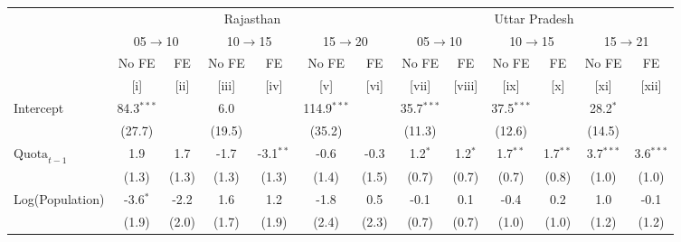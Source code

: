 
\begingroup
\centering
\scriptsize
\begin{adjustbox}{max width=\linewidth}
   \begin{threeparttable}[b]
      \begin{tabular}{lcccccccccccc}
         \toprule
          & \multicolumn{6}{c}{Rajasthan} & \multicolumn{6}{c}{Uttar Pradesh} \\
          & \multicolumn{2}{c}{05$\rightarrow$10} & \multicolumn{2}{c}{10$\rightarrow$15} & \multicolumn{2}{c}{15$\rightarrow$20} & \multicolumn{2}{c}{05$\rightarrow$10} & \multicolumn{2}{c}{10$\rightarrow$15} & \multicolumn{2}{c}{15$\rightarrow$21} \\
                                 & No FE        & FE         & No FE       & FE          & No FE         & FE          & No FE        & FE          & No FE        & FE           & No FE        & FE \\
                                 & [i]          & [ii]       & [iii]       & [iv]        & [v]           & [vi]        & [vii]        & [viii]      & [ix]         & [x]          & [xi]         & [xii]\\
         \midrule
         Intercept               & 84.3$^{***}$ &            & 6.0         &             & 114.9$^{***}$ &             & 35.7$^{***}$ &             & 37.5$^{***}$ &              & 28.2$^{*}$   &   \\
                                 & (27.7)       &            & (19.5)      &             & (35.2)        &             & (11.3)       &             & (12.6)       &              & (14.5)       &   \\
         $\text{Quota}_{t-1}$    & 1.9          & 1.7        & -1.7        & -3.1$^{**}$ & -0.6          & -0.3        & 1.2$^{*}$    & 1.2$^{*}$   & 1.7$^{**}$   & 1.7$^{**}$   & 3.7$^{***}$  & 3.6$^{***}$\\
                                 & (1.3)        & (1.3)      & (1.3)       & (1.3)       & (1.4)         & (1.5)       & (0.7)        & (0.7)       & (0.7)        & (0.8)        & (1.0)        & (1.0)\\
         Log(Population)         & -3.6$^{*}$   & -2.2       & 1.6         & 1.2         & -1.8          & 0.5         & -0.1         & 0.1         & -0.4         & 0.2          & 1.0          & -0.1\\
                                 & (1.9)        & (2.0)      & (1.7)       & (1.9)       & (2.4)         & (2.3)       & (0.7)        & (0.7)       & (1.0)        & (1.0)        & (1.2)        & (1.2)\\

\end{tabular}
\end{threeparttable}
\end{adjustbox}
